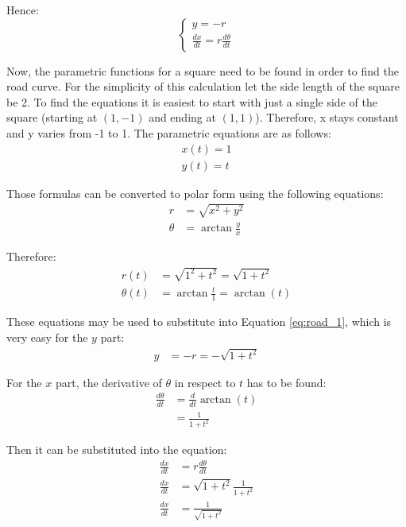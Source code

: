 \documentclass[12pt]{article}
\begin{document}
        Hence:
        \begin{equation}\label{eq:road_1}
            \begin{cases}
                y = -r \\
                \frac{dx}{dt} = r \frac{d\theta}{dt}
            \end{cases}
        \end{equation}

        Now, the parametric functions for a square need to be found in order to find the road curve. For the simplicity of this calculation let the side length of the square be 2. To find the equations it is easiest to start with just a single side of the square (starting at $(1, -1)$ and ending at $(1, 1)$). Therefore, x stays constant and y varies from -1 to 1. The parametric equations are as follows:
        \begin{align}
            x(t) = 1 \\
            y(t) = t
        \end{align}

        Those formulas can be converted to polar form using the following equations\cite{polar_rectangular}:
        \begin{align}
            r &= \sqrt{x^2 + y^2} \\
            \theta &= \arctan\frac{y}{x}
        \end{align}

        Therefore:
        \begin{align}
            r(t) &= \sqrt{1^2 + t^2} = \sqrt{1+t^2} \\
            \theta(t) &= \arctan\frac{t}{1} = \arctan(t)
        \end{align}

        These equations may be used to substitute into Equation \ref{eq:road_1}, which is very easy for the $y$ part:
        \begin{align}
            y &= -r = -\sqrt{1+t^2}
        \end{align}

        For the $x$ part, the derivative of $\theta$ in respect to $t$ has to be found:
        \begin{align}
            \frac{d\theta}{dt} &= \frac{d}{dt} \arctan(t) \\
            &= \frac{1}{1+t^2}
        \end{align}

        Then it can be substituted into the equation:
        \begin{align}
            \frac{dx}{dt} &= r \frac{d\theta}{dt} \\
            \frac{dx}{dt} &= \sqrt{1+t^2} \frac{1}{1+t^2} \\
            \frac{dx}{dt} &= \frac{1}{\sqrt{1+t^2}}
        \end{align}
\end{document}
